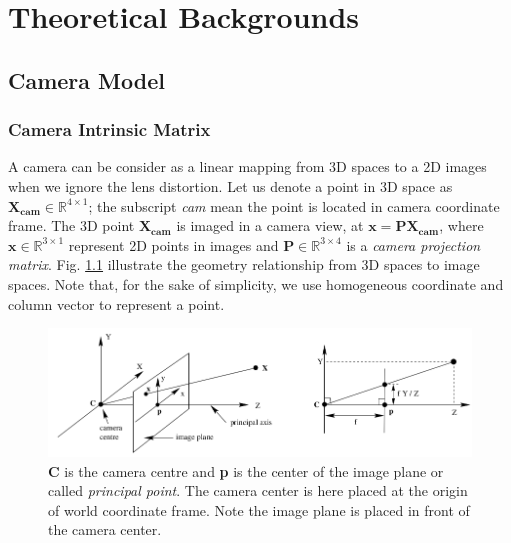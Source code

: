 
\chapter{Theoretical Backgrounds}\label{chapter:introduction}
\section{Camera Model}
\subsection{Camera Intrinsic Matrix}
A camera can be consider as a linear mapping from 3D spaces to a 2D images when we ignore the lens distortion. Let us denote a point in 3D space as $\mathbf{X_{cam}} \in \mathbb{R}^{4\times1}$; the subscript \textit{cam} mean the point is located in camera coordinate frame. The 3D point $\mathbf{X_{cam}}$ is imaged in a camera view, at $\mathbf{x = PX_{cam}}$, where $\mathbf{x} \in \mathbb{R}^{3\times1}$ represent 2D points in images and $\mathbf{P} \in \mathbb{R}^{3\times4}$ is a \textit{camera projection matrix}. Fig. \ref{fig:ch1-pinhole-camera-geometry} \cite{book:multivew-geometry} illustrate the geometry relationship from 3D spaces to image spaces. Note that, for the sake of simplicity, we use homogeneous coordinate and column vector to represent a point.

\begin{figure}[htpb]
	\centering
	\includegraphics[width=0.7\columnwidth]{figures/ch1/pinhole-camera-geometry}
	\caption{\textbf{C} is the camera centre and \textbf{p} is the center of the image plane or called \textit{principal point}. The camera
		center is here placed at the origin of world coordinate frame. Note the image plane is placed in front of the camera center.}
	\label{fig:ch1-pinhole-camera-geometry}
\end{figure}

